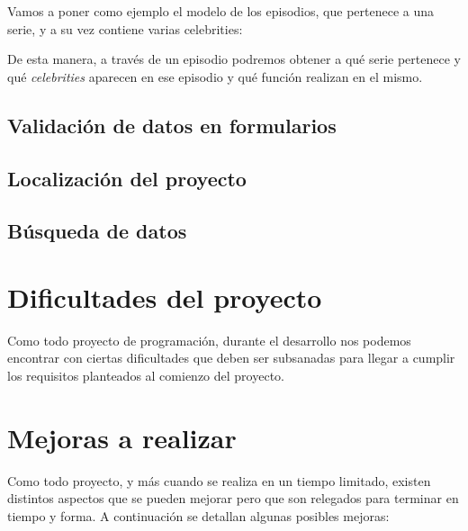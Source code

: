 \documentclass{\ClassPath/viu-tfm-template}
\begin{document}
Vamos a poner como ejemplo el modelo de los episodios, que pertenece a una serie, y a su vez contiene varias celebrities:


De esta manera, a través de un episodio podremos obtener a qué serie pertenece y qué \textit{celebrities} aparecen en ese episodio y qué función realizan en el mismo.

\section{Validación de datos en formularios}




\section{Localización del proyecto}



\section{Búsqueda de datos}



\chapter{Dificultades del proyecto}

Como todo proyecto de programación, durante el desarrollo nos podemos encontrar con ciertas dificultades que deben ser subsanadas para llegar a cumplir los requisitos planteados al comienzo del proyecto.



\chapter{Mejoras a realizar}
Como todo proyecto, y más cuando se realiza en un tiempo limitado, existen distintos aspectos que se pueden mejorar pero que son relegados para terminar en tiempo y forma. A continuación se detallan algunas posibles mejoras:
\end{document}

